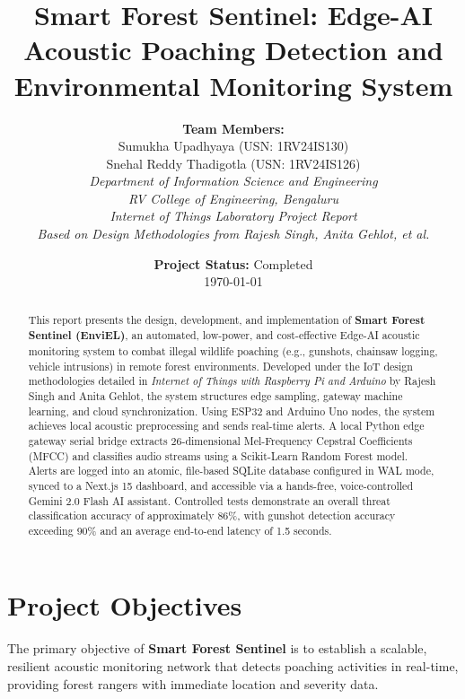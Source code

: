 \documentclass[11pt,a4paper]{article}
\title{\textbf{Smart Forest Sentinel: Edge-AI Acoustic Poaching Detection and Environmental Monitoring System}}
\author{
    \textbf{Team Members:} \\
    Sumukha Upadhyaya (USN: 1RV24IS130) \\
    Snehal Reddy Thadigotla (USN: 1RV24IS126) \\[0.3cm]
    \textit{Department of Information Science and Engineering} \\
    \textit{RV College of Engineering, Bengaluru} \\[0.5cm]
    \textit{Internet of Things Laboratory Project Report} \\
    \textit{Based on Design Methodologies from Rajesh Singh, Anita Gehlot, et al.}
}
\date{\textbf{Project Status:} Completed \\ \today}
\begin{document}
\maketitle

\begin{abstract}
This report presents the design, development, and implementation of \textbf{Smart Forest Sentinel (EnviEL)}, an automated, low-power, and cost-effective Edge-AI acoustic monitoring system to combat illegal wildlife poaching (e.g., gunshots, chainsaw logging, vehicle intrusions) in remote forest environments. Developed under the IoT design methodologies detailed in \textit{Internet of Things with Raspberry Pi and Arduino} by Rajesh Singh and Anita Gehlot, the system structures edge sampling, gateway machine learning, and cloud synchronization. Using ESP32 and Arduino Uno nodes, the system achieves local acoustic preprocessing and sends real-time alerts. A local Python edge gateway serial bridge extracts 26-dimensional Mel-Frequency Cepstral Coefficients (MFCC) and classifies audio streams using a Scikit-Learn Random Forest model. Alerts are logged into an atomic, file-based SQLite database configured in WAL mode, synced to a Next.js 15 dashboard, and accessible via a hands-free, voice-controlled Gemini 2.0 Flash AI assistant. Controlled tests demonstrate an overall threat classification accuracy of approximately 86\%, with gunshot detection accuracy exceeding 90\% and an average end-to-end latency of 1.5 seconds.
\end{abstract}

\newpage

\section{Project Objectives}
The primary objective of \textbf{Smart Forest Sentinel} is to establish a scalable, resilient acoustic monitoring network that detects poaching activities in real-time, providing forest rangers with immediate location and severity data.
\end{document}
